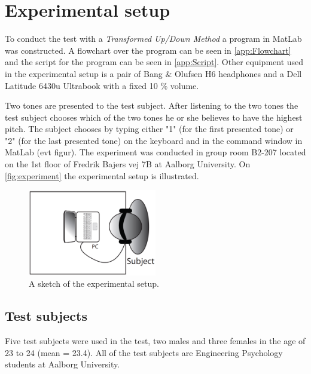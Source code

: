 \section*{Experimental setup}
%
To conduct the test with a \textit{Transformed Up/Down Method} a program in MatLab was constructed. A flowchart over the program can be seen in \autoref{app:Flowchart} and the script for the program can be seen in \autoref{app:Script}. Other equipment used in the experimental setup is a pair of Bang $\&$ Olufsen H6 headphones and a Dell Latitude 6430u Ultrabook with a fixed 10 \% volume.

Two tones are presented to the test subject. After listening to the two tones the test subject chooses which of the two tones he or she believes to have the highest pitch. The subject chooses by typing either "1" (for the first presented tone) or "2" (for the last presented tone) on the keyboard and in the command window in MatLab (evt figur).\blankline
%
% 
\noindent
The experiment was conducted in group room B2-207 located on the 1st floor of Fredrik Bajers vej 7B at Aalborg University. On \autoref{fig:experiment} the experimental setup is illustrated. 
%
\begin{figure}[H]
\centering
\includegraphics[width = 0.5\textwidth]{Figure/experiment.png} 
\caption{A sketch of the experimental setup.}
\label{fig:experiment}
\end{figure}
%

\subsection*{Test subjects}
%
Five test subjects were used in the test, two males and three females in the age of 23 to 24 (mean = 23.4). All of the test subjects are Engineering Psychology students at Aalborg University. 